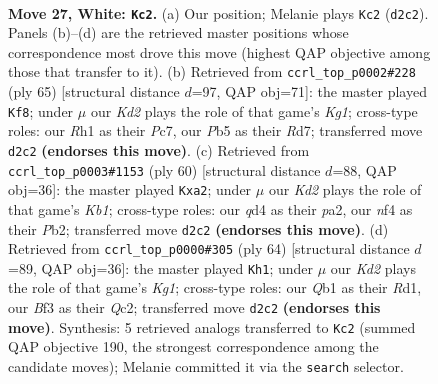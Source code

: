 \documentclass[11pt]{article}
\begin{document}
\clearpage

\begin{figure}[p]\centering
\begin{subfigure}{0.46\textwidth}\centering
\resizebox{\linewidth}{!}{%
\newchessgame
\chessboard[
  setfen={rn4r1/4k3/1p2p3/pP3pN1/3q1n1p/5B1P/P2K2P1/RQ5R w - - 2 27},
  showmover=false,
  pgfstyle=straightmove, color=movearrow, markmove={d2-c2}
]}
\caption{}
\end{subfigure}\hfill
\begin{subfigure}{0.46\textwidth}\centering
\resizebox{\linewidth}{!}{%
\newchessgame
\chessboard[
  setfen={3r2k1/2pr4/pb3nQ1/5N2/1P1pP3/P1p4P/2q2PP1/4R1K1 b - - 1 33},
  showmover=false,
  pgfstyle=straightmove, color=movearrow, markmove={g8-f8}
]}
\caption{}
\end{subfigure}
\\[4pt]
\begin{subfigure}{0.46\textwidth}\centering
\resizebox{\linewidth}{!}{%
\newchessgame
\chessboard[
  setfen={4r1k1/1r3p1n/3p2p1/p2Np1P1/4P1Rq/3P1Q2/pP5P/1K1R4 w - - 0 31},
  showmover=false,
  pgfstyle=straightmove, color=movearrow, markmove={b1-a2}
]}
\caption{}
\end{subfigure}\hfill
\begin{subfigure}{0.46\textwidth}\centering
\resizebox{\linewidth}{!}{%
\newchessgame
\chessboard[
  setfen={4r1k1/1p3pp1/2p2n1p/p7/3NP3/PP1BR2q/2Q2P1b/3R2K1 w - - 2 33},
  showmover=false,
  pgfstyle=straightmove, color=movearrow, markmove={g1-h1}
]}
\caption{}
\end{subfigure}
\caption{\textbf{Move 27, White: \texttt{Kc2}.} (a) Our position; Melanie plays \texttt{Kc2} (\texttt{d2c2}). Panels (b)--(d) are the retrieved master positions whose correspondence most drove this move (highest QAP objective among those that transfer to it). (b) Retrieved from \texttt{ccrl\_top\_p0002\#228} (ply 65) [structural distance $d$=97, QAP obj=71]: the master played \texttt{Kf8}; under $\mu$ our \emph{Kd2} plays the role of that game's \emph{Kg1}; cross-type roles: our \emph{R}h1 as their \emph{P}c7, our \emph{P}b5 as their \emph{R}d7; transferred move \texttt{d2c2} \textbf{(endorses this move)}. (c) Retrieved from \texttt{ccrl\_top\_p0003\#1153} (ply 60) [structural distance $d$=88, QAP obj=36]: the master played \texttt{Kxa2}; under $\mu$ our \emph{Kd2} plays the role of that game's \emph{Kb1}; cross-type roles: our \emph{q}d4 as their \emph{p}a2, our \emph{n}f4 as their \emph{P}b2; transferred move \texttt{d2c2} \textbf{(endorses this move)}. (d) Retrieved from \texttt{ccrl\_top\_p0000\#305} (ply 64) [structural distance $d$=89, QAP obj=36]: the master played \texttt{Kh1}; under $\mu$ our \emph{Kd2} plays the role of that game's \emph{Kg1}; cross-type roles: our \emph{Q}b1 as their \emph{R}d1, our \emph{B}f3 as their \emph{Q}c2; transferred move \texttt{d2c2} \textbf{(endorses this move)}. Synthesis: 5 retrieved analogs transferred to \texttt{Kc2} (summed QAP objective 190, the strongest correspondence among the candidate moves); Melanie committed it via the \texttt{search} selector.}
\label{fig:thought-m52}
\end{figure}
\end{document}
